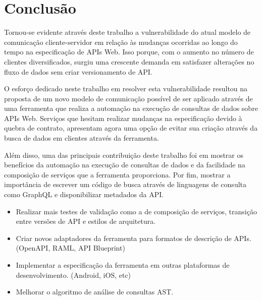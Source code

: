 \chapter{Conclusão}

Tornou-se evidente através deste trabalho a vulnerabilidade do atual modelo de comunicação cliente-servidor em relação às mudanças ocorridas ao longo do tempo na especificação de APIs Web. Isso porque, com o aumento no número de clientes diversificados, surgiu uma crescente demanda em satisfazer alterações no fluxo de dados sem criar versionamento de API.

O esforço dedicado neste trabalho em resolver esta vulnerabilidade resultou na proposta de um novo modelo de comunicação possível de ser aplicado através de uma ferramenta que realiza a automação na execução de consultas de dados sobre APIs Web. Serviços que hesitam realizar mudanças na especificação devido à quebra de contrato, apresentam agora uma opção de evitar sua criação através da busca de dados em clientes através da ferramenta.

Além disso, uma das principais contribuição deste trabalho foi em mostrar os benefícios da automação na execução de consultas de dados e da facilidade na composição de serviços que a ferramenta proporciona. Por fim, mostrar a importância de escrever um código de busca através de linguagens de consulta como GraphQL e disponibilizar metadados da API.



\begin{itemize}
\item Realizar mais testes de validação como a de composição de serviços, transição entre versões de API e estilos de arquitetura.
\item Criar novos adaptadores da ferramenta para formatos de descrição de APIs. (OpenAPI, RAML, API Blueprint)
\item Implementar a especificação da ferramenta em outras plataformas de desenvolvimento. (Android, iOS, etc)
\item Melhorar o algoritmo de análise de consultas AST.
\end{itemize}
